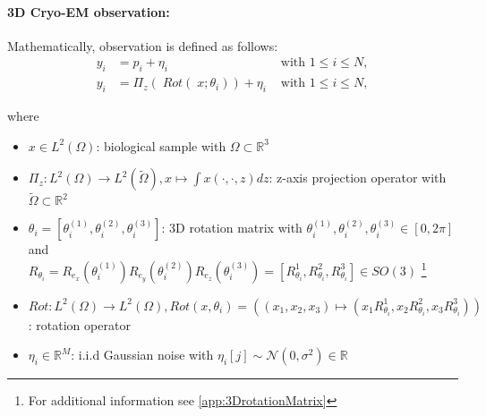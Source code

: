 \paragraph{3D Cryo-EM observation:}
Mathematically, observation is defined as follows:
\begin{equation}
    \label{eq:cryoEmSimple}
    \begin{aligned}
        y_i &= p_i + \eta_i &\text{ with } 1 \leq i \leq N,\\
        y_i &= \Pi_z  (\; Rot (\;x; \theta_i )) + \eta_i &\text{ with } 1 \leq i \leq N,    
    \end{aligned}
\end{equation}

where 
\begin{itemize}
    \item $x \in L^2(\Omega)$: biological sample with $\Omega \subset \mathbb{R}^3 $
    \item $\Pi_z : L^2(\Omega) \to L^2(\tilde{\Omega}), x \mapsto  \int x(\cdot,\cdot,z) dz$: z-axis projection operator
          with $\tilde{\Omega} \subset \mathbb{R}^2$
    \item $\theta_i = [\theta_i^{(1)}, \theta_i^{(2)}, \theta_i^{(3)} ] $: 3D rotation matrix with $ \theta_i^{(1)}, \theta_i^{(2)}, \theta_i^{(3)} \in [0, 2 \pi]$ and \\
          $R_{\theta_i} =  R_{e_x} (\theta_i^{(1)}) R_{e_y} (\theta_i^{(2)}) R_{e_z} (\theta_i^{(3)}) = [R^1_{\theta_i}, R^2_{\theta_i}, R^3_{\theta_i}] \in SO(3)$ 
          \footnote{For additional information see \ref{app:3DrotationMatrix}}
          
    \item $\textit{Rot} : L^2(\Omega) \to L^2(\Omega), \textit{Rot}(x, \theta_i) = \left((x_1,x_2,x_3) \mapsto ( x_1R^1_{\theta_i}, x_2R^2_{\theta_i}, x_3R^3_{\theta_i})\right)$: rotation operator
    \item $\eta_i \in \mathbb{R}^M$: i.i.d Gaussian noise with $\eta_i[j] \sim \mathcal{N}(0,\sigma^2) \in \mathbb{R}$
\end{itemize}



